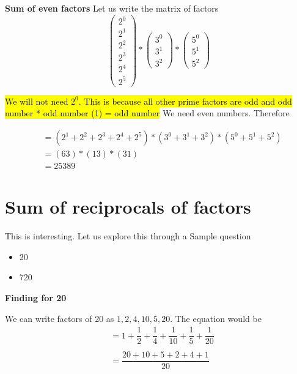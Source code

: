 \textbf{Sum of even factors}
Let us write the matrix of factors
$$
\begin{pmatrix}
    2^0 \\
    2^1 \\
    2^2 \\
    2^3 \\
    2^4 \\
    2^5 
\end{pmatrix}
*
\begin{pmatrix}
    3^0 \\
    3^1 \\
    3^2
\end{pmatrix}
*
\begin{pmatrix}
    5^0 \\
    5^1 \\
    5^2
\end{pmatrix}
$$

\hl{We will not need $2^0$. This is because all other prime factors are odd and odd number * odd number (1) = odd number} We need even numbers. Therefore

\begin{align*}
    &= (2^1 + 2^2 + 2^3 + 2^4 + 2^5) * (3^0 + 3^1 + 3^2) * (5^0 + 5^1 + 5^2) \\
    &= (63) * (13) * (31) \\
    &= 25389
\end{align*}

\section{Sum of reciprocals of factors}
This is interesting. Let us explore this through a Sample question

\begin{itemize}
    \item 20
    \item 720
\end{itemize}

\textbf{Finding for 20}

We can write factors of 20 as $1,2,4,10,5,20$. The equation would be
\begin{align*}
    &= 1 + \dfrac{1}{2} + \dfrac{1}{4} + \dfrac{1}{10} + \dfrac{1}{5} + \dfrac{1}{20} \\ \\ 
    &= \dfrac{20 + 10 + 5 + 2 + 4 + 1}{20}
\end{align*}

